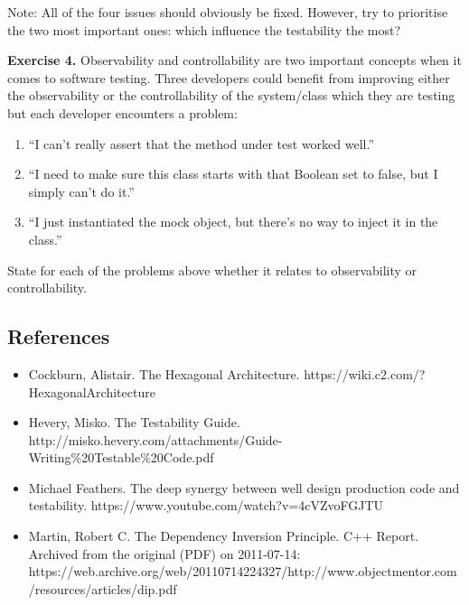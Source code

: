 Note: All of the four issues should obviously be fixed. However, try to
prioritise the two most important ones: which influence the testability
the most?

\textbf{Exercise 4.} Observability and controllability are two important
concepts when it comes to software testing. Three developers could
benefit from improving either the observability or the controllability
of the system/class which they are testing but each developer encounters
a problem:

\begin{enumerate}
\def\labelenumi{\arabic{enumi}.}
\tightlist
\item
  ``I can't really assert that the method under test worked well.''
\item
  ``I need to make sure this class starts with that Boolean set to
  false, but I simply can't do it.''
\item
  ``I just instantiated the mock object, but there's no way to inject it
  in the class.''
\end{enumerate}

State for each of the problems above whether it relates to observability
or controllability.

\hypertarget{references}{%
\subsection{References}\label{references}}

\begin{itemize}
\item
  Cockburn, Alistair. The Hexagonal Architecture.
  https://wiki.c2.com/?HexagonalArchitecture
\item
  Hevery, Misko. The Testability Guide.
  http://misko.hevery.com/attachments/Guide-Writing\%20Testable\%20Code.pdf
\item
  Michael Feathers. The deep synergy between well design production code
  and testability. https://www.youtube.com/watch?v=4cVZvoFGJTU
\item
  Martin, Robert C. The Dependency Inversion Principle. C++ Report.
  Archived from the original (PDF) on 2011-07-14:
  https://web.archive.org/web/20110714224327/http://www.objectmentor.com/resources/articles/dip.pdf
\end{itemize}
